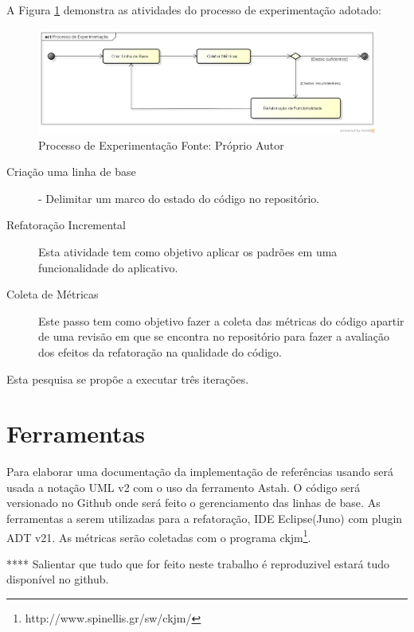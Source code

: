 A Figura \ref{processo_experimentacao} demonstra as atividades do processo de
experimentação adotado:
\begin{figure}[!h]
	\centering
	\includegraphics[scale=0.5]{img/processo_experimentacao.png}
	\caption{Processo de Experimentação Fonte: Próprio Autor}
	\label{processo_experimentacao}
\end{figure}

\begin{description}
\item[Criação uma linha de base] - Delimitar um marco do estado do código no
repositório.
\item[Refatoração Incremental] Esta atividade tem como objetivo aplicar os
padrões em uma funcionalidade do aplicativo.
\item[Coleta de Métricas] Este passo tem como objetivo fazer a coleta
das métricas do código apartir de uma revisão em que se encontra no repositório
para fazer a avaliação dos efeitos da refatoração na qualidade do código.
\end{description}

Esta pesquisa se propõe a executar três iterações.

\section{Ferramentas}

Para elaborar uma documentação da implementação de referências usando será usada
a notação UML v2 com o uso da ferramento Astah. O código será versionado no
Github onde será feito o gerenciamento das linhas de base. As ferramentas a
serem utilizadas para a refatoração, IDE Eclipse(Juno) com plugin ADT v21. As
métricas serão coletadas com o programa
ckjm\footnote{http://www.spinellis.gr/sw/ckjm/}.

**** Salientar que tudo que for feito neste trabalho é reproduzivel estará tudo
disponível no github.

